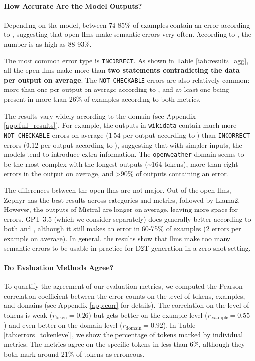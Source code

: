 \paragraph{How Accurate Are the Model Outputs?}
Depending on the model, between 74-85\% of examples contain an error according to \humanmetric, suggesting that open \acp{llm} make semantic errors very often. According to \gptmetric, the number is as high as 88-93\%.

The most common error type is \texttt{INCORRECT}. As shown in Table \ref{tab:results_agg}, all the open \acp{llm} make more than \textbf{two statements contradicting the data per output on average}. The \texttt{NOT\_CHECKABLE} errors are also relatively common: more than one per output on average according to \humanmetric, and at least one being present in more than 26\% of examples according to both metrics.

The results vary widely according to the domain (see Appendix \ref{app:full_results}). For example, the outputs in \texttt{wikidata} contain much more \texttt{NOT\_CHECKABLE} errors on average (1.54 per output according to \humanmetric) than  \texttt{INCORRECT} errors (0.12 per output according to \humanmetric), suggesting that with simpler inputs, the models tend to introduce extra information. The \texttt{openweather} domain seems to be the most complex with the longest outputs (\textasciitilde 164 tokens), more than eight errors in the output on average, and >90\% of outputs containing an error.

The differences between the open \acp{llm} are not major. Out of the open \acp{llm}, Zephyr has the best results across categories and metrics, followed by Llama2. However, the outputs of Mistral are longer on average, leaving more space for errors. GPT-3.5 (which we consider separately) does generally better according to both \gptmetric and \humanmetric, although it still makes an error in 60-75\% of examples (2 errors per example on average). In general, the results show that \acp{llm} make too many semantic errors to be usable in practice for D2T generation in a zero-shot setting.



\paragraph{Do Evaluation Methods Agree?}
\label{sec:metricscorr}
To quantify the agreement of our evaluation metrics, we computed the Pearson correlation coefficient between the error counts on the level of tokens, examples, and domains (see Appendix \ref{app:corr} for details). The correlation on the level of tokens is weak ($r_{\text{token}}=0.26$) but gets better on the example-level ($r_{\text{example}}=0.55$) and even better on the domain-level ($r_{\text{domain}}=0.92$). In Table \ref{tab:errors_tokenlevel}, we show the percentage of tokens marked by individual metrics. The metrics agree on the specific tokens in less than 6\%, although they both mark around 21\% of tokens as erroneous.


